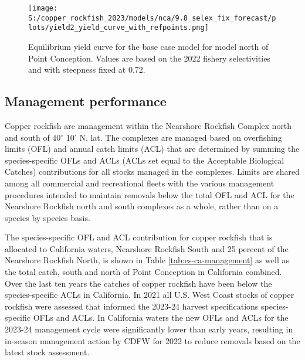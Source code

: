 \documentclass[11pt,
  english,
  letterpaper,
]{article}
\begin{document}
\begin{figure}
\centering
\texttt{[image: S:/copper\_rockfish\_2023/models/nca/9.8\_selex\_fix\_forecast/plots/yield2\_yield\_curve\_with\_refpoints.png]}
\caption{Equilibrium yield curve for the base case model for model north of Point Conception. Values are based on the 2022 fishery selectivities and with steepness fixed at 0.72.\label{fig:north-es-yield}}
\end{figure}

\pagebreak

\hypertarget{management-performance}{%
\subsection*{Management performance}\label{management-performance}}

Copper rockfish are management within the Nearshore Rockfish Complex north and south of 40\(^\circ\) 10' N. lat. The complexes are managed based on overfishing limits (OFL) and annual catch limits (ACL) that are determined by summing the species-specific OFLs and ACLs (ACLs set equal to the Acceptable Biological Catches) contributions for all stocks managed in the complexes. Limits are shared among all commercial and recreational fleets with the various management procedures intended to maintain removals below the total OFL and ACL for the Nearshore Rockfish north and south complexes as a whole, rather than on a species by species basis.

The species-specific OFL and ACL contribution for copper rockfish that is allocated to California waters, Nearshore Rockfish South and 25 percent of the Nearshore Rockfish North, is shown in Table \ref{tab:es-ca-management} as well as the total catch, south and north of Point Conception in California combined. Over the last ten years the catches of copper rockfish have been below the species-specific ACLs in California. In 2021 all U.S. West Coast stocks of copper rockfish were assessed that informed the 2023-24 harvest specifications species-specific OFLs and ACLs. In California waters the new OFLs and ACLs for the 2023-24 management cycle were significantly lower than early years, resulting in in-season management action by CDFW for 2022 to reduce removals based on the latest stock assessment.

\begingroup\fontsize{10}{12}\selectfont
\begingroup\fontsize{10}{12}\selectfont
\end{document}
